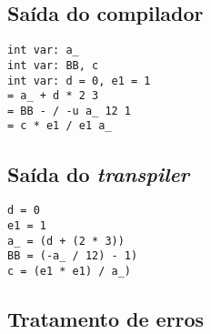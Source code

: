 \documentclass{article}
\begin{document}
\subsection{Saída do compilador}

\begin{verbatim}
int var: a_
int var: BB, c
int var: d = 0, e1 = 1
= a_ + d * 2 3
= BB - / -u a_ 12 1
= c * e1 / e1 a_
\end{verbatim}

\subsection{Saída do \emph{transpiler}}

\begin{verbatim}
d = 0
e1 = 1
a_ = (d + (2 * 3))
BB = (-a_ / 12) - 1)
c = (e1 * e1) / a_)
\end{verbatim}

\subsection{Tratamento de erros}
\end{document}
